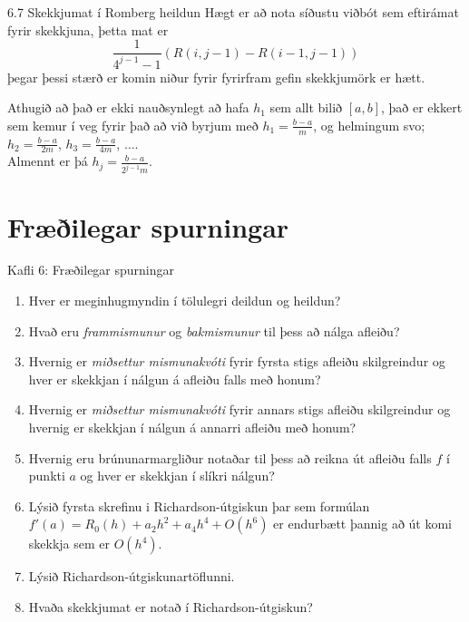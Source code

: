 \begin{frame}{6.7 Skekkjumat í Romberg heildun} 
Hægt er að nota síðustu viðbót sem eftirámat fyrir skekkjuna, þetta mat er
\begin{equation*}
  \frac{1}{4^{j-1}-1}\left( R(i,j-1) - R(i-1,j-1)\right)
\end{equation*}
þegar þessi stærð er komin niður fyrir fyrirfram gefin skekkjumörk er
hætt. 

\medskip\pause

Athugið að það er ekki nauðsynlegt að hafa $h_1$ sem allt bilið $[a,b]$, það er ekkert sem 
kemur í veg fyrir það að við byrjum með $h_1 = \frac{b-a}{m}$, og helmingum svo;
$h_2 = \frac{b-a}{2m}$, $h_3 = \frac{b-a}{4m}$, $\ldots$.\\
Almennt er þá $h_j=\frac{b-a}{2^{j-1}m}$.
\end{frame}


\section*{Fræðilegar spurningar}
\begin{frame}{Kafli 6: Fræðilegar spurningar}
  \begin{enumerate}
  \item  Hver er meginhugmyndin í tölulegri deildun og heildun?
  \item  Hvað eru {\it frammismunur} og {\it bakmismunur} til þess að
    nálga afleiðu?
  \item  Hvernig er {\it miðsettur mismunakvóti} fyrir fyrsta stigs
    afleiðu skilgreindur og hver 
    er skekkjan í nálgun á afleiðu falls með honum?
  \item  Hvernig er {\it miðsettur mismunakvóti} fyrir annars stigs
    afleiðu skilgreindur og hvernig er skekkjan í nálgun á annarri
    afleiðu með honum?
  \item  Hvernig eru  brúnunarmargliður notaðar til þess að
    reikna út afleiðu falls $f$ í punkti $a$ og hver er skekkjan í
    slíkri nálgun?
  \item  Lýsið fyrsta skrefinu i Richardson-útgiskun þar sem 
formúlan $f'(a)=R_0(h)+a_2h^2+a_4h^4+O(h^6)$ er endurbætt þannig að út
komi skekkja sem er $O(h^4)$.
  \item  Lýsið Richardson-útgiskunartöflunni. 
  \item  Hvaða skekkjumat er notað í Richardson-útgiskun?
  \end{enumerate}
\end{frame}


